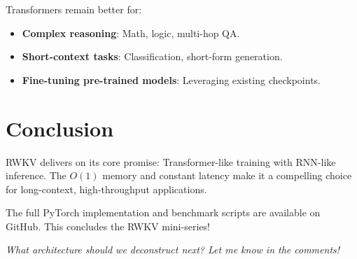 \documentclass[12pt]{article}
\begin{document}
Transformers remain better for:
\begin{itemize}
    \item \textbf{Complex reasoning}: Math, logic, multi-hop QA.
    \item \textbf{Short-context tasks}: Classification, short-form generation.
    \item \textbf{Fine-tuning pre-trained models}: Leveraging existing checkpoints.
\end{itemize}

\section*{Conclusion}

RWKV delivers on its core promise: Transformer-like training with RNN-like inference. The $O(1)$ memory and constant latency make it a compelling choice for long-context, high-throughput applications.

The full PyTorch implementation and benchmark scripts are available on GitHub. This concludes the RWKV mini-series!

\vspace{1em}
\noindent \textit{What architecture should we deconstruct next? Let me know in the comments!}
\end{document}
